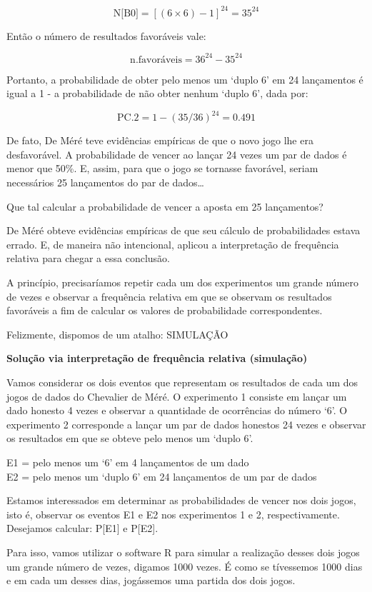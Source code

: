 \documentclass[
]{book}
\theoremstyle{definition}
\theoremstyle{definition}
\theoremstyle{definition}
\theoremstyle{remark}
\begin{document}
\[\text{N[B0]} =  {[(6 \times 6) - 1]^{24} = 35^{24}}\]

Então o número de resultados favoráveis vale:

\[\text{n.favoráveis} =  {36^{24} - 35^{24}}\]

Portanto, a probabilidade de obter pelo menos um `duplo 6' em 24 lançamentos é igual a 1 - a probabilidade de não obter nenhum `duplo 6', dada por:

\[\text{PC.2} =  {1 - (35/36)^{24} = 0.491}\]

De fato, De Méré teve evidências empíricas de que o novo jogo lhe era desfavorável. A probabilidade de vencer ao lançar 24 vezes um par de dados é menor que 50\%. E, assim, para que o jogo se tornasse favorável, seriam necessários 25 lançamentos do par de dados\ldots{}

Que tal calcular a probabilidade de vencer a aposta em 25 lançamentos?

De Méré obteve evidências empíricas de que seu cálculo de probabilidades estava errado. E, de maneira não intencional, aplicou a interpretação de frequência relativa para chegar a essa conclusão.

A princípio, precisaríamos repetir cada um dos experimentos um grande número de vezes e observar a frequência relativa em que se observam os resultados favoráveis a fim de calcular os valores de probabilidade correspondentes.

Felizmente, dispomos de um atalho: SIMULAÇÃO

\textbf{Solução via interpretação de frequência relativa (simulação)}

Vamos considerar os dois eventos que representam os resultados de cada um dos jogos de dados do Chevalier de Méré. O experimento 1 consiste em lançar um dado honesto 4 vezes e observar a quantidade de ocorrências do número `6'. O experimento 2 corresponde a lançar um par de dados honestos 24 vezes e observar os resultados em que se obteve pelo menos um `duplo 6'.

E1 = pelo menos um `6' em 4 lançamentos de um dado\\
E2 = pelo menos um `duplo 6' em 24 lançamentos de um par de dados

Estamos interessados em determinar as probabilidades de vencer nos dois jogos, isto é, observar os eventos E1 e E2 nos experimentos 1 e 2, respectivamente. Desejamos calcular: P{[}E1{]} e P{[}E2{]}.

Para isso, vamos utilizar o software R para simular a realização desses dois jogos um grande número de vezes, digamos 1000 vezes. É como se tívessemos 1000 dias e em cada um desses dias, jogássemos uma partida dos dois jogos.
\end{document}
